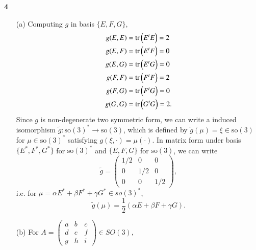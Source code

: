 \documentclass[a4paper, 12pt]{article}
\theoremstyle{Mydefinition}
\theoremstyle{Mytheorem}
\begin{document}
\noindent \textbf{4}
\begin{enumerate}
    \item[(a)]Computing $g$ in basis $\{E,F,G\}$,
\begin{equation*}
\begin{split}
    g(E,E) &= \tr\left(E^t E\right) = 2\\
    g(E,F) &= \tr\left(E^t F\right) = 0\\
    g(E,G) &= \tr\left(E^t G\right) = 0\\
    g(F,F) &= \tr\left(F^t F\right) = 2\\
    g(F,G) &= \tr\left(F^t G\right) = 0\\
    g(G,G) &= \tr\left(G^t G\right) = 2.
\end{split}
\end{equation*}
Since $g$ is non-degenerate two symmetric form, we can write a induced isomorphism $\tilde{g}:\mathrm{so}(3)^*\rightarrow \mathrm{so}(3)$, which is defined by $\tilde{g}(\mu) = \xi\in\mathrm{so}(3)$ for $\mu\in\mathrm{so}(3)^*$ satisfying $g(\xi, \cdot) = \mu(\cdot)$. In matrix form under basis $\{E^*, F^*, G^*\}$ for $\mathrm{so}(3)^*$ and $\{E,F,G\}$ for $\mathrm{so}(3)$, we can write
\begin{equation*}
    \tilde{g}=\begin{pmatrix}
        1/2 & 0 & 0\\
        0 & 1/2 & 0\\
        0 & 0 & 1/2
    \end{pmatrix},
\end{equation*}
i.e. for $\mu = \alpha E^*+\beta F^*+\gamma G^*\in \mathit{so}(3)^*$, 
\begin{equation*}
    \tilde{g}(\mu) = \frac{1}{2}(\alpha E + \beta F + \gamma G).
\end{equation*}

\item[(b)] For $A=\begin{pmatrix}
        a & b & c\\
        d & e & f\\
        g & h & i
    \end{pmatrix}\in \mathit{SO}(3)$,
    

\end{enumerate}
\end{document}

